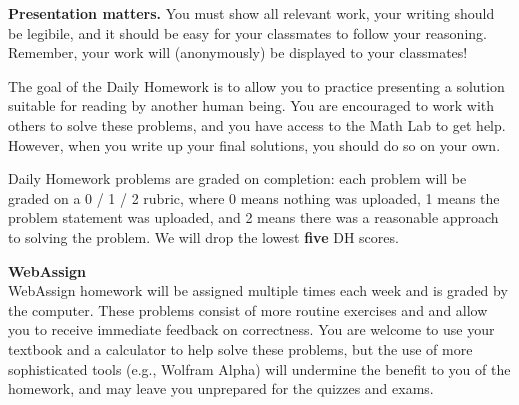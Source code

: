 \documentclass[12pt]{article}
\renewcommand{\emph}[1]{\textsf{\textbf{#1}}}
\newcommand{\localhead}[1]{\par\smallskip\textbf{#1}\nobreak\\}%
\def\subheading#1{\localhead{\emph{#1}}}
\begin{document}
\emph{Presentation matters.} You must show all relevant work, your writing
should be legibile, and it should be easy for your classmates to follow
your reasoning. Remember, your work will (anonymously) be displayed to your classmates!

The goal of the Daily Homework is to allow you to practice presenting 
 a solution suitable for reading by another human being.  You are 
encouraged to work with others to solve these problems, and you 
have access to the Math Lab to get help.  However, when you 
write up your final solutions, you should do so on your own. 

Daily Homework problems are graded on completion: each problem will be graded on a 0 / 1 / 2 rubric, where 0 means nothing was uploaded, 1 means the problem statement was uploaded, and 2 means there was a reasonable approach to solving the problem. We will drop the lowest {\bf five} DH scores.


%
%

\subheading{WebAssign} 
WebAssign homework will be assigned multiple times each week and is graded by the computer. These problems consist of more routine exercises and and allow
you to receive immediate feedback on correctness. %
You are welcome
to use your textbook and a calculator to help solve these problems, but
the use of more sophisticated tools (e.g., Wolfram Alpha) will undermine
the benefit to you of the homework, and may leave you unprepared for
the quizzes and exams.
\end{document}
